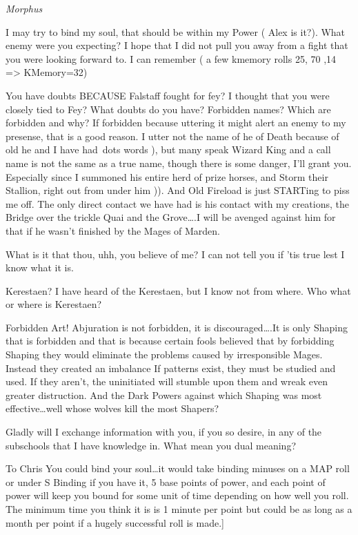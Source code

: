 {{\em Morphus}

I may try to bind my soul, that should be within my Power (
Alex is it?). What enemy were you expecting? I hope that I did not pull 
you away from a fight that you were looking forward to. I can remember (
a few k\-memory rolls 25, 70 ,14 => K\-Memory=32)

You have doubts BECAUSE Falstaff fought for fey? I thought that you 
were closely tied to Fey? What doubts do you have?
Forbidden names? Which are forbidden and why? If forbidden because 
uttering it might alert an enemy to my presense, that is a good reason. 
I utter not the name of he of Death because of old he and I have had\
dots words \-), but many speak Wizard King and a call name is not the 
same as a true name, though there is some danger, I'll grant you. 
Especially since I summoned his entire herd of prize horses, and Storm 
their Stallion, right out from under him \-)). And Old Fireload is just 
STARTing to piss me off. The only direct contact we have had is his 
contact with my creations, the Bridge over the trickle Quai and the 
Grove\dots.I will be avenged against him for that if he wasn't finished 
by the Mages of Marden. 

What is it that thou, uhh, you believe of me? I can not tell you if 'tis 
true lest I know what it is.

Kerestaen? I have heard of the Kerestaen, but I know not from where. Who 
what or where is Kerestaen?

Forbidden Art! Abjuration is not forbidden, it is discouraged\dots.It is 
only Shaping that is forbidden and that is because certain fools 
believed that by forbidding Shaping they would eliminate the problems 
caused by irresponsible Mages. Instead they created an imbalance \- If 
patterns exist, they must be studied and used. If they aren't, the 
uninitiated will stumble upon them and wreak even greater distruction. 
And the Dark Powers against which Shaping was most effective\dots well 
whose wolves kill the most Shapers?

Gladly will I exchange information with you, if you so desire, in any of 
the subschools that I have knowledge in. 
What mean you \- dual meaning?

To Chris You could bind your soul\dots it would take binding minuses on a 
MAP roll or under S Binding if you have it, 5 base points of power, and 
each point of power will keep you bound for some unit of time depending 
on how well you roll. The minimum time you think it is is 1 minute per 
point but could be as long as a month per point if a hugely successful 
roll is made.]

}
